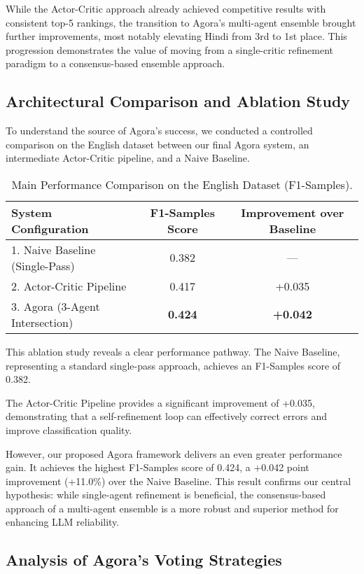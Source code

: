 While the Actor-Critic approach already achieved competitive results with consistent top-5 rankings, the transition to Agora's multi-agent ensemble brought further improvements, most notably elevating Hindi from 3rd to 1st place. This progression demonstrates the value of moving from a single-critic refinement paradigm to a consensus-based ensemble approach.

\subsection{Architectural Comparison and Ablation Study}

To understand the source of Agora's success, we conducted a controlled comparison on the English dataset between our final Agora system, an intermediate Actor-Critic pipeline, and a Naive Baseline.

\begin{table*}[ht]
\centering
\caption{Main Performance Comparison on the English Dataset (F1-Samples).}
\label{tab:main_comparison}
\begin{tabular}{lcc}
\hline
\textbf{System Configuration} & \textbf{F1-Samples Score} & \textbf{Improvement over Baseline} \\
\hline
1. Naive Baseline (Single-Pass) & 0.382 & --- \\
2. Actor-Critic Pipeline & 0.417 & +0.035 \\
3. Agora (3-Agent Intersection) & \textbf{0.424} & \textbf{+0.042} \\
\hline
\end{tabular}
\end{table*}

This ablation study reveals a clear performance pathway. The Naive Baseline, representing a standard single-pass approach, achieves an F1-Samples score of 0.382.

The Actor-Critic Pipeline provides a significant improvement of +0.035, demonstrating that a self-refinement loop can effectively correct errors and improve classification quality.

However, our proposed Agora framework delivers an even greater performance gain. It achieves the highest F1-Samples score of 0.424, a +0.042 point improvement (+11.0\%) over the Naive Baseline. This result confirms our central hypothesis: while single-agent refinement is beneficial, the consensus-based approach of a multi-agent ensemble is a more robust and superior method for enhancing LLM reliability.

\subsection{Analysis of Agora's Voting Strategies}

